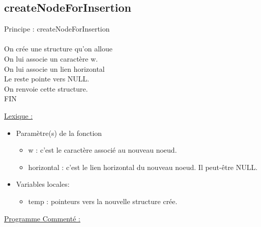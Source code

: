 \documentclass[a4paper]{article}
\newcommand\tab[1][1cm]{\hspace*{#1}}
\begin{document}


\subsection{createNodeForInsertion}
\begin{algorithm}
Principe : createNodeForInsertion 
\\
\\
\tab On crée une structure qu'on alloue
\\
\tab On lui associe un caractère w.
\\
\tab On lui associe un lien horizontal
\\
\tab Le reste pointe vers NULL.
\\
\tab On renvoie cette structure.
\\
FIN
\end{algorithm}
\underline{Lexique :}
\begin{itemize}
\item Paramètre(s) de la fonction  
\begin{itemize}
\item w : c'est le caractère associé au nouveau noeud.
\item horizontal : c'est le lien horizontal du nouveau noeud. Il peut-être NULL.
\end{itemize}
\item Variables locales:
\begin{itemize}
\item temp : pointeurs vers la nouvelle structure crée.
\end{itemize}
\end{itemize}
\underline{Programme Commenté :}



\newpage
\end{document}

